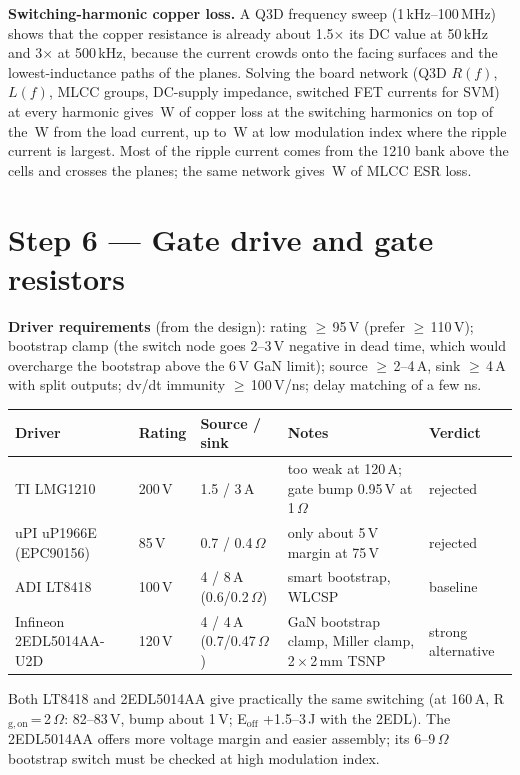 ﻿\documentclass[10pt,a4paper]{article}
\begin{document}
\textbf{Switching-harmonic copper loss.} A Q3D frequency sweep (1\,kHz--100\,MHz) shows that the copper resistance is already about 1.5$\times$ its DC value at 50\,kHz and 3$\times$ at 500\,kHz, because the current crowds onto the facing surfaces and the lowest-inductance paths of the planes. Solving the board network (Q3D $R(f)$, $L(f)$, MLCC groups, DC-supply impedance, switched FET currents for SVM) at every harmonic gives \PcuHf\,W of copper loss at the switching harmonics on top of the \Pcu\,W from the load current, up to \PcuHfLowM\,W at low modulation index where the ripple current is largest. Most of the ripple current comes from the 1210 bank above the cells and crosses the planes; the same network gives \Pcap\,W of MLCC ESR loss.

\section{Step 6 --- Gate drive and gate resistors}
\textbf{Driver requirements} (from the design): rating $\geq$\,95\,V (prefer $\geq$\,110\,V); bootstrap clamp (the switch node goes 2--3\,V negative in dead time, which would overcharge the bootstrap above the 6\,V GaN limit); source $\geq$\,2--4\,A, sink $\geq$\,4\,A with split outputs; dv/dt immunity $\geq$\,100\,V/ns; delay matching of a few ns.
\begin{table}[H]\centering\small
\begin{tabular}{@{}L{3.3cm}lL{2.9cm}L{5.0cm}L{1.9cm}@{}}\toprule
Driver & Rating & Source / sink & Notes & Verdict \\\midrule
TI LMG1210 & 200\,V & 1.5 / 3\,A & too weak at 120\,A; gate bump 0.95\,V at 1\,$\Omega$ & rejected \\
uPI uP1966E (EPC90156) & 85\,V & 0.7 / 0.4\,$\Omega$ & only about 5\,V margin at 75\,V & rejected \\
ADI LT8418 & 100\,V & 4 / 8\,A (0.6/0.2\,$\Omega$) & smart bootstrap, WLCSP & baseline \\
Infineon 2EDL5014AA-U2D & 120\,V & 4 / 4\,A (0.7/0.47\,$\Omega$) & GaN bootstrap clamp, Miller clamp, 2\,$\times$\,2\,mm TSNP & strong alternative \\
\bottomrule\end{tabular}\end{table}
Both LT8418 and 2EDL5014AA give practically the same switching (at 160\,A, R$_\mathrm{g,on}$\,=\,2\,$\Omega$: 82--83\,V, bump about 1\,V; E$_\mathrm{off}$ +1.5--3\,\textmu J with the 2EDL). The 2EDL5014AA offers more voltage margin and easier assembly; its 6--9\,$\Omega$ bootstrap switch must be checked at high modulation index.
\end{document}
